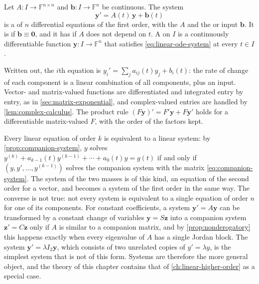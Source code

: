\begin{definition}
\label{def:linear-ode-system}
Let $A\colon I\to\mathbb F^{n\times n}$ and $\mathbf b\colon I\to\mathbb F^n$ be continuous. The system
\begin{equation}
\mathbf y'=A(t)\,\mathbf y+\mathbf b(t)
\label{eq:linear-ode-system}
\end{equation}
is a  of $n$ differential equations of the first order, with the  $A$ and the  or input $\mathbf b$. It is  if $\mathbf b\equiv\mathbf 0$, and it has  if $A$ does not depend on $t$. A  on $I$ is a continuously differentiable function $\mathbf y\colon I\to\mathbb F^n$ that satisfies \eqref{eq:linear-ode-system} at every $t\in I$.
\end{definition}

Written out, the $i$th equation is $y_i'=\sum_ja_{ij}(t)y_j+b_i(t)$: the rate of change of each component is a linear combination of all components, plus an input. Vector- and matrix-valued functions are differentiated and integrated entry by entry, as in \cref{sec:matrix-exponential}, and complex-valued entries are handled by \cref{lem:complex-calculus}. The product rule $(F\mathbf y)'=F'\mathbf y+F\mathbf y'$ holds for a differentiable matrix-valued $F$, with the order of the factors kept.

Every linear equation of order $k$ is equivalent to a linear system: by \cref{prop:companion-system}, $y$ solves $y^{(k)}+a_{k-1}(t)y^{(k-1)}+\cdots+a_0(t)y=g(t)$ if and only if $(y,y',\ldots,y^{(k-1)})$ solves the companion system with the matrix \eqref{eq:companion-system}. The system of the two masses is of this kind, an equation of the second order for a vector, and becomes a system of the first order in the same way. The converse is not true: not every system is equivalent to a single equation of order $n$ for one of its components. For constant coefficients, a system $\mathbf y'=A\mathbf y$ can be transformed by a constant change of variables $\mathbf y=S\mathbf z$ into a companion system $\mathbf z'=C\mathbf z$ only if $A$ is similar to a companion matrix, and by \cref{prop:nonderogatory} this happens exactly when every eigenvalue of $A$ has a single Jordan block. The system $\mathbf y'=\lambda I_2\mathbf y$, which consists of two unrelated copies of $y'=\lambda y$, is the simplest system that is not of this form. Systems are therefore the more general object, and the theory of this chapter contains that of \cref{ch:linear-higher-order} as a special case.

